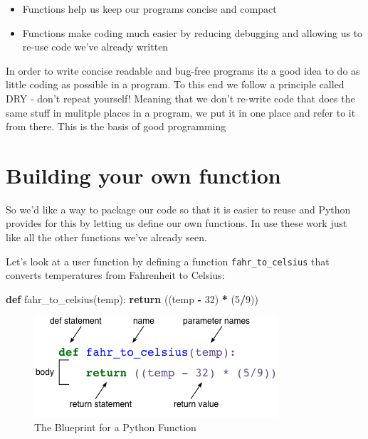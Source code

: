 \documentclass[]{book}
\newenvironment{Shaded}{\begin{snugshade}}{\end{snugshade}}
\newcommand{\ControlFlowTok}[1]{\textcolor[rgb]{0.13,0.29,0.53}{\textbf{#1}}}
\newcommand{\DecValTok}[1]{\textcolor[rgb]{0.00,0.00,0.81}{#1}}
\newcommand{\KeywordTok}[1]{\textcolor[rgb]{0.13,0.29,0.53}{\textbf{#1}}}
\newcommand{\NormalTok}[1]{#1}
\newcommand{\OperatorTok}[1]{\textcolor[rgb]{0.81,0.36,0.00}{\textbf{#1}}}
\providecommand{\tightlist}{%
  \setlength{\itemsep}{0pt}\setlength{\parskip}{0pt}}
\theoremstyle{definition}
\theoremstyle{definition}
\theoremstyle{definition}
\theoremstyle{remark}
\begin{document}
\begin{itemize}
\tightlist
\item
  Functions help us keep our programs concise and compact
\item
  Functions make coding much easier by reducing debugging and allowing
  us to re-use code we've already written
\end{itemize}

In order to write concise readable and bug-free programs its a good idea
to do as little coding as possible in a program. To this end we follow a
principle called DRY - don't repeat yourself! Meaning that we don't
re-write code that does the same stuff in mulitple places in a program,
we put it in one place and refer to it from there. This is the basis of
good programming

\hypertarget{building-your-own-function}{%
\section{Building your own function}\label{building-your-own-function}}

So we'd like a way to package our code so that it is easier to reuse and
Python provides for this by letting us define our own functions. In use
these work just like all the other functions we've already seen.

Let's look at a user function by defining a function
\texttt{fahr\_to\_celsius} that converts temperatures from Fahrenheit to
Celsius:

\begin{Shaded}
\begin{Highlighting}[]
\KeywordTok{def}\NormalTok{ fahr_to_celsius(temp):}
    \ControlFlowTok{return}\NormalTok{ ((temp }\OperatorTok{-} \DecValTok{32}\NormalTok{) }\OperatorTok{*}\NormalTok{ (}\DecValTok{5}\OperatorTok{/}\DecValTok{9}\NormalTok{))}
\end{Highlighting}
\end{Shaded}

\begin{figure}
\centering
\includegraphics{assets/python-function.png}
\caption{The Blueprint for a Python Function}
\end{figure}
\end{document}
